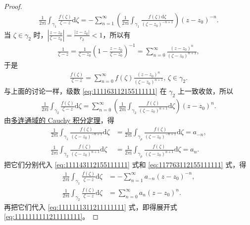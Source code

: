 \documentclass[../../main.tex]{subfiles}
\begin{document}
\begin{proof}
\begin{align}
\frac{1}{2\pi \mathrm{i}} \int_{\gamma_1} \frac{f(\zeta)}{\zeta - z} \mathrm{d}\zeta = -\sum_{n = 1}^{\infty} \left( \frac{1}{2\pi \mathrm{i}} \int_{\gamma_1} \frac{f(\zeta) \mathrm{d}\zeta}{(\zeta - z_0)^{-n + 1}} \right) (z - z_0)^{-n}. \label{eq:111143112155111111}
\end{align}
当 \( \zeta \in \gamma_2 \) 时，\( \left| \frac{z - z_0}{\zeta - z_0} \right| = \frac{|z - z_0|}{r_2} < 1 \)，所以有
\begin{align*}
\frac{1}{\zeta - z} = \frac{1}{\zeta - z_0} \left( 1 - \frac{z - z_0}{\zeta - z_0} \right)^{-1} = \sum_{n = 0}^{\infty} \frac{(z - z_0)^n}{(\zeta - z_0)^{n + 1}},
\end{align*}
于是
\begin{align}
\frac{f(\zeta)}{\zeta - z} = \sum_{n = 0}^{\infty} f(\zeta) \frac{(z - z_0)^n}{(\zeta - z_0)^{n + 1}}, \, \zeta \in \gamma_2. \label{eq:111163112155111111}
\end{align}
与上面的讨论一样，级数 \eqref{eq:111163112155111111} 在 \( \gamma_2 \) 上一致收敛，所以
\begin{align}
\frac{1}{2\pi \mathrm{i}} \int_{\gamma_2} \frac{f(\zeta)}{\zeta - z} \mathrm{d}\zeta = \sum_{n = 0}^{\infty} \left( \frac{1}{2\pi \mathrm{i}} \int_{\gamma_2} \frac{f(\zeta)}{(\zeta - z_0)^{n + 1}} \mathrm{d}\zeta \right) (z - z_0)^n. \label{eq:117763112155111111}
\end{align}
由\hyperref[theorem:定理3.2.5]{多连通域的 Cauchy 积分定理}，得
\begin{align*}
\frac{1}{2\pi \mathrm{i}} \int_{\gamma_1} \frac{f(\zeta)}{(\zeta - z_0)^{-n + 1}} \mathrm{d}\zeta &= \frac{1}{2\pi \mathrm{i}} \int_{\gamma_{\rho}} \frac{f(\zeta)}{(\zeta - z_0)^{-n + 1}} \mathrm{d}\zeta = a_{-n}, \\
\frac{1}{2\pi \mathrm{i}} \int_{\gamma_2} \frac{f(\zeta)}{(\zeta - z_0)^{n + 1}} \mathrm{d}\zeta &= \frac{1}{2\pi \mathrm{i}} \int_{\gamma_{\rho}} \frac{f(\zeta)}{(\zeta - z_0)^{n + 1}} \mathrm{d}\zeta = a_n.
\end{align*}
把它们分别代入 \eqref{eq:111143112155111111} 式和 \eqref{eq:117763112155111111} 式，得
\begin{align*}
\frac{1}{2\pi \mathrm{i}} \int_{\gamma_1} \frac{f(\zeta)}{\zeta - z} \mathrm{d}\zeta &= -\sum_{n = 1}^{\infty} a_{-n} (z - z_0)^{-n}, \\
\frac{1}{2\pi \mathrm{i}} \int_{\gamma_2} \frac{f(\zeta)}{\zeta - z} \mathrm{d}\zeta &= \sum_{n = 0}^{\infty} a_n (z - z_0)^n.
\end{align*}
再把它们代入 \eqref{eq:1111111311211111111} 式，即得展开式 \eqref{eq:1111111111211111111}。


\end{proof}
\end{document}
